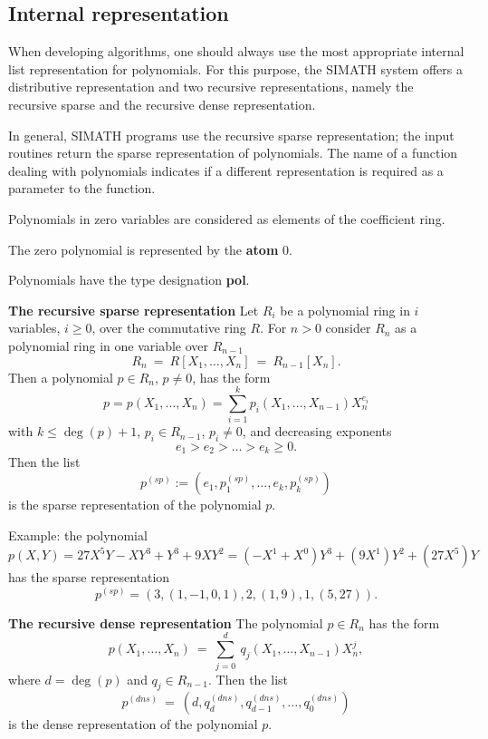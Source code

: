 \subsection{Internal representation}
When developing algorithms, one should always use the most appropriate 
internal list representation for polynomials. For this purpose, the
SIMATH system offers a distributive representation and two recursive representations, namely the recursive sparse and the recursive dense representation.

In general, SIMATH programs use the recursive sparse representation; the input routines return 
the sparse representation of polynomials. The name of a function dealing with polynomials
indicates if a different representation is required as a parameter to the function.

Polynomials in zero variables are considered as elements of the coefficient ring.

The zero polynomial is represented by the {\bf atom} $0$.

Polynomials have the type designation {\bf pol}.

\newpage

{\bf The recursive sparse representation} 
\leer
Let $R_i$ be a polynomial ring in $i$ variables, $i\geq 0$,
over the commutative ring $R$. For $n>0$ consider $R_n$ as a 
polynomial ring in one variable over $R_{n-1}$
$$ 
R_n\ =\ R[X_1,\ldots,X_n]\ =\ R_{n-1}[X_n].
$$ 
Then a polynomial $p \in R_n$, $p\not=0$, has the form 
$$
p = p(X_1,\ldots,X_n) = \sum_{i=1}^k p_i(X_1,\ldots, X_{n-1})X_n^{e_i}
$$ 
with $k \leq \deg(p)+1$, $p_i \in R_{n-1}$, $p_i \neq 0$, and decreasing exponents
$$ 
e_1 > e_2 > \ldots > e_k \geq 0.
$$ 
Then the list
$$ 
p^{(sp)} := (e_1, p_1^{(sp)}, \ldots,e_k, p_k^{(sp)}) 
$$ 
is the sparse representation of the polynomial $p$.

Example: the polynomial 
\begin{displaymath}
            p(X,Y) =  27 X^5 Y - X Y^3 + Y^3 + 9 X Y^2
                   =  (-X^1 + X^0) Y^3 + (9 X^1) Y^2 + (27 X^5) Y
\end{displaymath} 
has the sparse representation
$$
       p^{(sp)}  =  (3, (1,-1,0,1), 2, (1,9), 1, (5,27)).
$$

{\bf The recursive dense representation}
\leer 
The polynomial $p \in R_n$ has the form
$$ 
      p(X_1,\ldots,X_n)\ =\ \sum_{j=0}^{d}\ q_j(X_1,\ldots,X_{n-1})X_n^j, 
$$ 
where $d=\deg(p)$ and $q_j \in R_{n-1}$. Then the list 
$$  
      p^{(dns)}\ =\ (d, q_d^{(dns)},q_{d-1}^{(dns)},\ldots,q_0^{(dns)})
$$ 
is the dense representation of the polynomial $p$.

